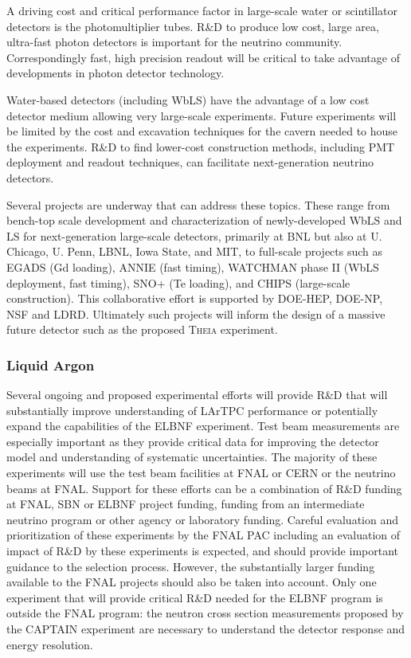A driving cost and critical performance factor in large-scale water or
scintillator detectors is the photomultiplier tubes. R\&D to produce
low cost, large area, ultra-fast photon detectors is important for the
neutrino community. Correspondingly fast, high precision readout will
be critical to take advantage of developments in photon detector
technology.

Water-based detectors (including WbLS) have the advantage of a low
cost detector medium allowing very large-scale experiments. Future
experiments will be limited by the cost and excavation techniques for
the cavern needed to house the experiments. R\&D to find lower-cost
construction methods, including PMT deployment and readout techniques,
can facilitate next-generation neutrino detectors.

Several projects are underway that can address these topics. These
range from bench-top scale development and characterization of
newly-developed WbLS and LS for next-generation large-scale detectors,
primarily at BNL but also at U. Chicago, U. Penn, LBNL, Iowa State,
and MIT, to full-scale projects such as EGADS (Gd loading), ANNIE
(fast timing), WATCHMAN phase II (WbLS deployment, fast timing), SNO+
(Te loading), and CHIPS (large-scale construction). This collaborative
effort is supported by DOE-HEP, DOE-NP, NSF and LDRD. Ultimately such
projects will inform the design of a massive future detector such as
the proposed \textsc{Theia} experiment.


\subsubsection{Liquid Argon}

Several ongoing and proposed experimental efforts will provide R\&D
that will substantially improve understanding of LArTPC performance or
potentially expand the capabilities of the ELBNF experiment. Test beam
measurements are especially important as they provide critical data
for improving the detector model and understanding of systematic
uncertainties.  The majority of these experiments will use the test
beam facilities at FNAL or CERN or the neutrino beams at FNAL. Support
for these efforts can be a combination of R\&D funding at FNAL, SBN or
ELBNF project funding, funding from an intermediate neutrino program
or other agency or laboratory funding.  Careful evaluation and
prioritization of these experiments by the FNAL PAC including an
evaluation of impact of R\&D by these experiments is expected, and
should provide important guidance to the selection process. However,
the substantially larger funding available to the FNAL projects should
also be taken into account. Only one experiment that will provide
critical R\&D needed for the ELBNF program is outside the FNAL
program: the neutron cross section measurements proposed by the
CAPTAIN experiment are necessary to understand the detector response
and energy resolution.

